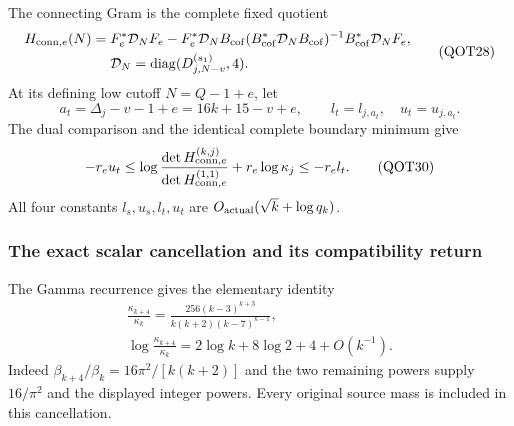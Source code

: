 \documentclass[11pt,a4paper]{article}
\begin{document}
The connecting Gram is the complete fixed quotient
\begin{equation}
\begin{split}
 H_{{\rm conn},e}(N)={}&F_e^*\mathcal D_NF_e
 -F_e^*\mathcal D_NB_{\rm cof}
 (B_{\rm cof}^*\mathcal D_NB_{\rm cof})^{-1}
 B_{\rm cof}^*\mathcal D_NF_e,\\
 &\mathcal D_N=\operatorname{diag}(D_{j,N-v}^{(s_1)},4).
\end{split}\label{QOT:eq:conn}
\tag{QOT28}
\end{equation}
At its defining low cutoff $N=Q-1+e$, let
\begin{equation}
 a_t=\Delta_j-v-1+e=16k+15-v+e,
 \qquad l_t=l_{j,a_t},\quad u_t=u_{j,a_t}.
 \label{QOT:eq:atgt}
\tag{QOT29}
\end{equation}
The dual comparison and the identical complete boundary minimum give
\begin{equation}
 -r_eu_t\le
 \log\frac{\det H_{{\rm conn},e}^{(k,j)}}{
                 \det H_{{\rm conn},e}^{(1,1)}}
       +r_e\log\kappa_j
 \le-r_el_t.
 \label{QOT:eq:targetorder}
\tag{QOT30}
\end{equation}
All four constants $l_s,u_s,l_t,u_t$ are $O_{\rm actual}(\sqrt k+\log q_k)$.

\subsubsection{The exact scalar cancellation and its compatibility return}
The Gamma recurrence gives the elementary identity
\begin{equation}
\boxed{\begin{gathered}
 \frac{\kappa_{k+4}}{\kappa_k}
 =\frac{256(k-3)^{k+3}}{k(k+2)(k-7)^{k-1}},\\
 \log\frac{\kappa_{k+4}}{\kappa_k}
 =2\log k+8\log2+4+O(k^{-1}).
\end{gathered}}
\label{QOT:eq:kappapair}
\tag{QOT31}
\end{equation}
Indeed $\beta_{k+4}/\beta_k=16\pi^2/[k(k+2)]$ and the two remaining powers supply $16/\pi^2$ and the displayed integer powers. Every original source mass is included in this cancellation.
\end{document}
